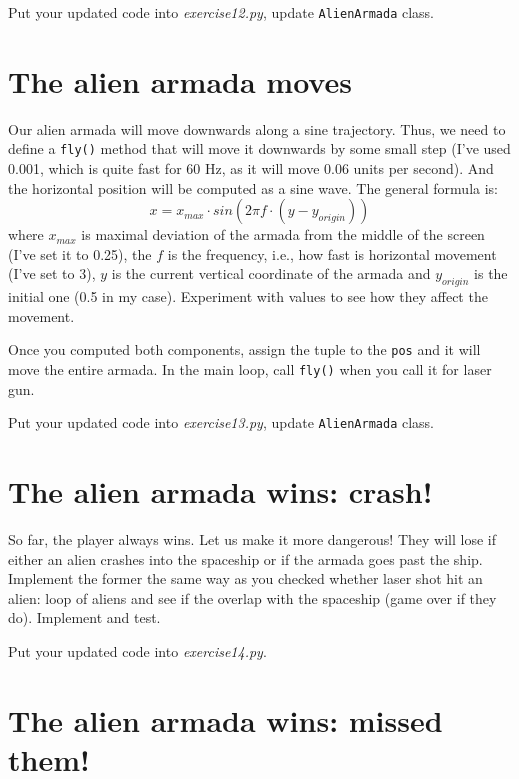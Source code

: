 \documentclass[
]{book}
\begin{document}
Put your updated code into \emph{exercise12.py}, update \texttt{AlienArmada} class.

\hypertarget{the-alien-armada-moves}{%
\section{The alien armada moves}\label{the-alien-armada-moves}}

Our alien armada will move downwards along a sine trajectory. Thus, we need to define a \texttt{fly()} method that will move it downwards by some small step (I've used 0.001, which is quite fast for 60 Hz, as it will move 0.06 units per second). And the horizontal position will be computed as a sine wave. The general formula is:
\[x = x_{max} \cdot sin(2 \pi f \cdot (y-y_{origin})) \]
where \(x_{max}\) is maximal deviation of the armada from the middle of the screen (I've set it to 0.25), the \(f\) is the frequency, i.e., how fast is horizontal movement (I've set to 3), \(y\) is the current vertical coordinate of the armada and \(y_{origin}\) is the initial one (0.5 in my case). Experiment with values to see how they affect the movement.

Once you computed both components, assign the tuple to the \texttt{pos} and it will move the entire armada. In the main loop, call \texttt{fly()} when you call it for laser gun.

Put your updated code into \emph{exercise13.py}, update \texttt{AlienArmada} class.

\hypertarget{the-alien-armada-wins-crash}{%
\section{The alien armada wins: crash!}\label{the-alien-armada-wins-crash}}

So far, the player always wins. Let us make it more dangerous! They will lose if either an alien crashes into the spaceship or if the armada goes past the ship. Implement the former the same way as you checked whether laser shot hit an alien: loop of aliens and see if the overlap with the spaceship (game over if they do). Implement and test.

Put your updated code into \emph{exercise14.py}.

\hypertarget{the-alien-armada-wins-missed-them}{%
\section{The alien armada wins: missed them!}\label{the-alien-armada-wins-missed-them}}
\end{document}
